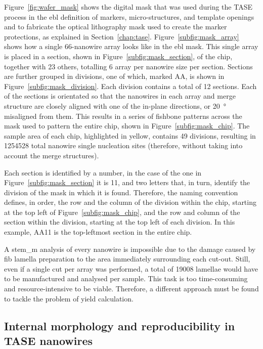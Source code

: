 Figure~\ref{fig:wafer_mask} shows the digital mask that was used during the \acs{TASE} process in the \acf{ebl} definition of markers, micro-structures, and template openings and to fabricate the optical lithography mask used to create the marker protections, as explained in Section~\ref{chap:tase}. Figure~\ref{subfig:mask_array} shows how a single \num{66}-nanowire array looks like in the \acs{ebl} mask. This single array is placed in a section, shown in Figure~\ref{subfig:mask_section}, of the chip, together with \num{23} others, totalling \num{6} array per nanowire size per section. Sections are further grouped in divisions, one of which, marked AA, is shown in Figure~\ref{subfig:mask_division}. Each division contains a total of \num{12} sections. Each of the sections is orientated so that the nanowires in each array and merge structure are closely aligned with one of the in-plane  directions, or \qty{20}{\degree} misaligned from them. This results in a series of fishbone patterns across the mask used to pattern the entire chip, shown in Figure~\ref{subfig:mask_chip}. The  sample area of each chip, highlighted in yellow, contains \num{49} divisions, resulting in \num{1254528} total nanowire single nucleation sites (therefore, without taking into account the merge structures). 

Each section is identified by a number, in the case of the one in Figure~\ref{subfig:mask_section} it is \num{11}, and two letters that, in turn, identify the division of the mask in which it is found. Therefore, the naming convention defines, in order, the row and the column of the division within the chip, starting at the top left of Figure~\ref{subfig:mask_chip}, and the row and column of the section within the division, starting at the top left of each division. In this example, AA11 is the top-leftmost section in the entire chip.

A \acs{stem_m} analysis of every nanowire is impossible due to the damage caused by \acf{fib} lamella preparation to the area immediately surrounding each cut-out. Still, even if a single cut per array was performed, a total of \num{19008} lamellae would have to be manufactured and analysed per sample. This task is too time-consuming and resource-intensive to be viable. Therefore, a different approach must be found to tackle the problem of yield calculation.

\subsection{\texorpdfstring{Internal morphology and reproducibility in \acs{TASE} nanowires}{Internal morphology and reproducibility in TASE nanowires}}


